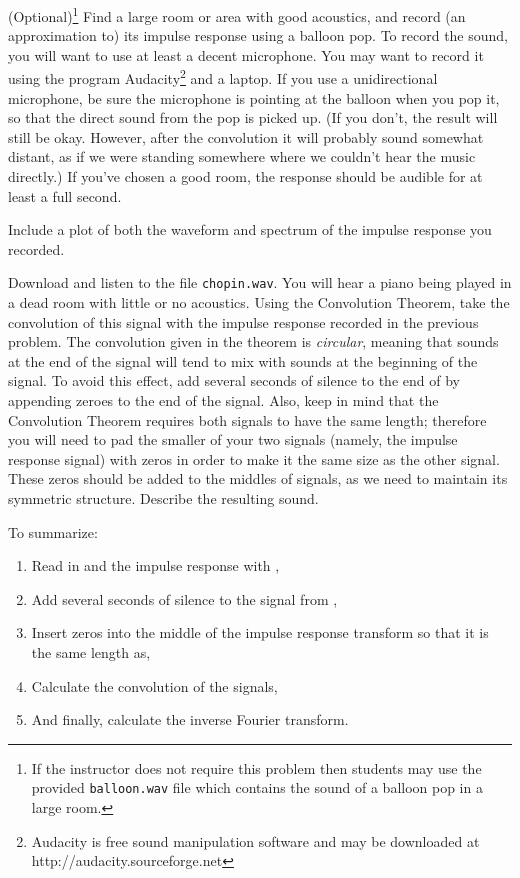 \begin{problem}
(Optional)\footnote{If the instructor does not require this problem then students may use the provided \texttt{balloon.wav} file which contains the sound of a balloon pop in a large room.} Find a large room or area with good acoustics, and record (an approximation to) its impulse response using a balloon pop.
To record the sound, you will want to use at least a decent microphone.
You may want to record it using the program Audacity\footnote{Audacity is free sound manipulation software and may be downloaded at http://audacity.sourceforge.net} and a laptop.
If you use a unidirectional microphone, be sure the microphone is pointing at the balloon when you pop it, so that the direct sound from the pop is picked up.
(If you don't, the result will still be okay.
However, after the convolution it will probably sound somewhat distant, as if we were standing somewhere where we couldn't hear the music directly.)
If you've chosen a good room, the response should be audible for at least a full second.

Include a plot of both the waveform and spectrum of the impulse response you recorded.
\end{problem}

\begin{problem}\label{convolution_problem}
Download and listen to the file \texttt{chopin.wav}.
You will hear a piano being played in a dead room with little or no acoustics.
Using the Convolution Theorem, take the convolution of this signal with the impulse response recorded in the previous problem.
The convolution given in the theorem is \emph{circular}, meaning that sounds at the end of the signal will tend to mix with sounds at the beginning of the signal.
To avoid this effect, add several seconds of silence to the end of  by appending zeroes to the end of the signal.
Also, keep in mind that the Convolution Theorem requires both signals to have the same length; therefore you will need to pad the smaller of your two signals (namely, the impulse response signal) with zeros in order to make it the same size as the other signal.
These zeros should be added to the middles of signals, as we need to maintain its symmetric structure.
Describe the resulting sound.

To summarize:
\begin{enumerate}

\item Read in  and the impulse response with ,
\item Add several seconds of silence to the signal from ,
\item Insert zeros into the middle of the impulse response transform so that it is the same length as,
\item Calculate the convolution of the signals,
\item And finally, calculate the inverse Fourier transform.
\end{enumerate}

\end{problem}

